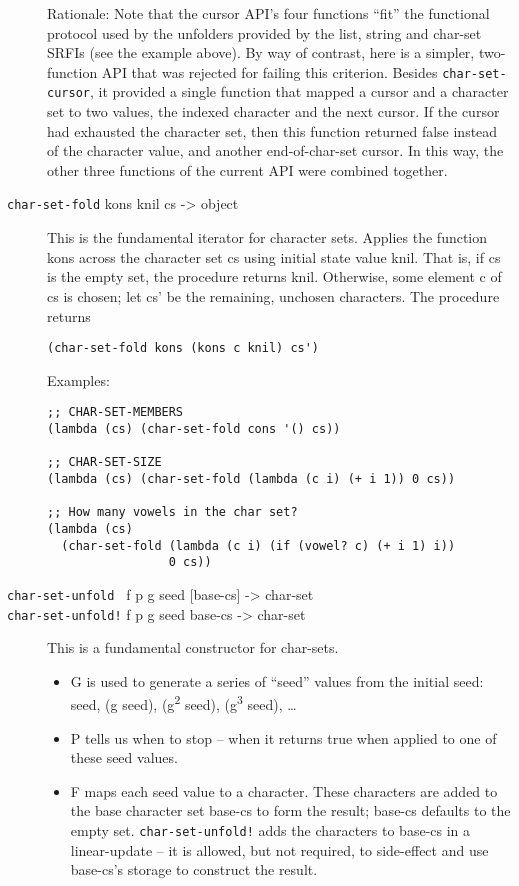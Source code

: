 \begin{description}
Rationale: Note that the cursor API's four functions ``fit'' the
functional protocol used by the unfolders provided by the list, string
and char-set SRFIs (see the example above). By way of contrast, here is
a simpler, two-function API that was rejected for failing this
criterion. Besides \texttt{char-set-cursor}, it provided a single
function that mapped a cursor and a character set to two values, the
indexed character and the next cursor. If the cursor had exhausted the
character set, then this function returned false instead of the
character value, and another end-of-char-set cursor. In this way, the
other three functions of the current API were combined together.
\item[ \href{}{} \texttt{char-set-fold} kons knil cs -\textgreater{}
object ]
This is the fundamental iterator for character sets. Applies the
function kons across the character set cs using initial state value
knil. That is, if cs is the empty set, the procedure returns knil.
Otherwise, some element c of cs is chosen; let cs' be the remaining,
unchosen characters. The procedure returns

\begin{verbatim}
(char-set-fold kons (kons c knil) cs')
\end{verbatim}

Examples:

\begin{verbatim}
;; CHAR-SET-MEMBERS
(lambda (cs) (char-set-fold cons '() cs))

;; CHAR-SET-SIZE
(lambda (cs) (char-set-fold (lambda (c i) (+ i 1)) 0 cs))

;; How many vowels in the char set?
(lambda (cs) 
  (char-set-fold (lambda (c i) (if (vowel? c) (+ i 1) i))
                 0 cs))
\end{verbatim}
\item[ \href{}{} \href{}{} \texttt{char-set-unfold~} f p g seed
{[}base-cs{]} -\textgreater{} char-set\\
\texttt{char-set-unfold!} f p g seed base-cs -\textgreater{} char-set ]
This is a fundamental constructor for char-sets.

\begin{itemize}
\tightlist
\item
  G is used to generate a series of ``seed'' values from the initial
  seed: seed, (g seed), (g\textsuperscript{2} seed),
  (g\textsuperscript{3} seed), \ldots{}
\item
  P tells us when to stop -- when it returns true when applied to one of
  these seed values.
\item
  F maps each seed value to a character. These characters are added to
  the base character set base-cs to form the result; base-cs defaults to
  the empty set. \texttt{char-set-unfold!} adds the characters to
  base-cs in a linear-update -- it is allowed, but not required, to
  side-effect and use base-cs's storage to construct the result.
\end{itemize}


\end{description}
